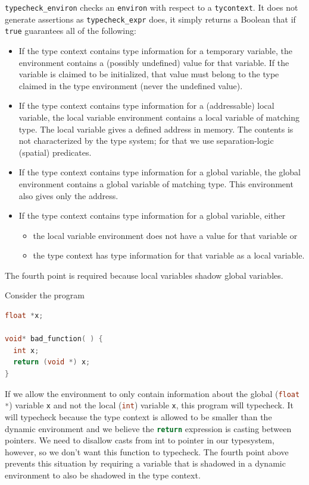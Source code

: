 \documentclass{puthesis}
\begin{document}
\lstinline|typecheck_environ| checks an \lstinline|environ| with respect to
a \lstinline|tycontext|. 
It does not generate assertions as
\lstinline|typecheck_expr| does, it simply returns a Boolean
that if \lstinline{true} guarantees all of the following:
\begin{itemize}
\item If the type context contains type information for a temporary
  variable, the environment contains a (possibly undefined) value for
  that variable. If the variable is claimed to be initialized, that
  value must belong to the type claimed in the type environment (never
  the undefined value).
\item If the type context contains type information for a
  (addressable) local variable, the local variable environment
  contains a local variable of matching type. The local variable gives
  a defined address in memory.  The contents is not characterized by
  the type system; for that we use separation-logic (spatial)
  predicates.
\item If the type context contains type information for a global
  variable, the global environment contains a global variable of
  matching type. This environment also gives only the address.
\item If the type context contains type information for a global
  variable, either
  \begin{itemize}
  \item the local variable environment does not have a value for that
    variable or
  \item the type context has type information for that variable as a
    local variable.
  \end{itemize}
\end{itemize}

\noindent The fourth point is required because local variables shadow global
variables.

Consider the program

\begin{lstlisting}[language = c]
float *x; 

void* bad_function( ) {
  int x;
  return (void *) x;
}
\end{lstlisting}

If we allow the environment to only contain information about the global
(\lstinline[language=c]|float *|) variable \lstinline|x| and not the
local (\lstinline[language=c]|int|) variable \lstinline|x|, this
program will typecheck. It will typecheck because the type context is allowed
to be smaller than the dynamic environment and we believe the
\lstinline[language=c]|return| expression is casting between pointers.
We need to disallow casts from int to pointer in our
typesystem, however, so we don't want this function to typecheck. The fourth
point above prevents this situation by requiring a variable that is shadowed in
a dynamic environment to also be shadowed in the type context.
\end{document}
